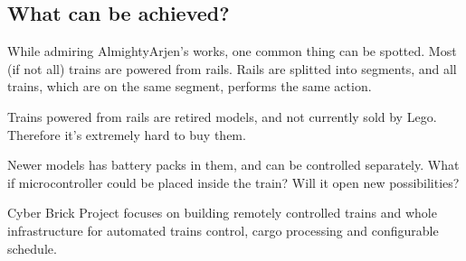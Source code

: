 
\subsection{What can be achieved?}

While admiring AlmightyArjen's works, one common thing can be spotted. Most (if not all) trains
are powered from rails. Rails are splitted into segments, and all trains, which are on the same
segment, performs the same action.

Trains powered from rails are retired models, and not currently sold by Lego. Therefore it's
extremely hard to buy them.

Newer models has battery packs in them, and can be controlled separately. What if
microcontroller could be placed inside the train? Will it open new possibilities?

Cyber Brick Project focuses on building remotely controlled trains and whole infrastructure
for automated trains control, cargo processing and configurable schedule.

